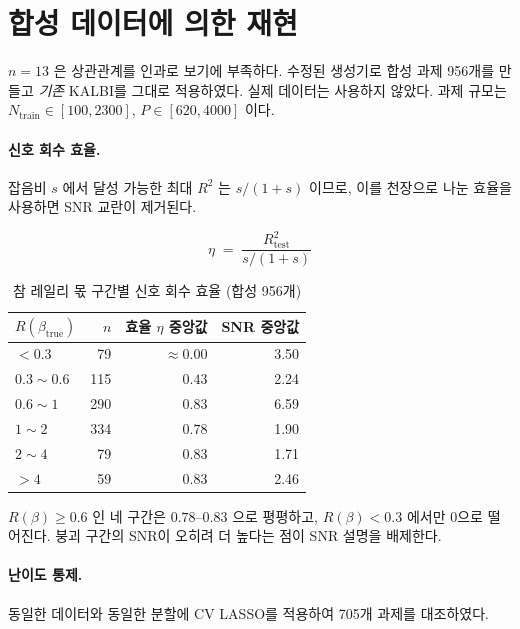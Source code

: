 \documentclass[11pt]{article}
\newcommand{\Rq}{R(\beta)}
\begin{document}
\section{합성 데이터에 의한 재현}

$n=13$ 은 상관관계를 인과로 보기에 부족하다.
수정된 생성기로 합성 과제 956개를 만들고 \emph{기존} KALBI를 그대로 적용하였다.
실제 데이터는 사용하지 않았다.
과제 규모는 $N_{\mathrm{train}} \in [100, 2300]$, $P \in [620, 4000]$ 이다.

\paragraph{신호 회수 효율.}
잡음비 $s$ 에서 달성 가능한 최대 $R^2$ 는 $s/(1+s)$ 이므로,
이를 천장으로 나눈 효율을 사용하면 SNR 교란이 제거된다.

\begin{equation}
\eta \;=\; \frac{R^2_{\text{test}}}{s/(1+s)}
\end{equation}

\begin{table}[h]
\centering
\caption{참 레일리 몫 구간별 신호 회수 효율 (합성 956개)}
\begin{tabular}{@{}lrrr@{}}
\toprule
$R(\beta_{\mathrm{true}})$ & $n$ & 효율 $\eta$ 중앙값 & SNR 중앙값 \\
\midrule
$< 0.3$      &  79 & $\approx 0.00$ & 3.50 \\
$0.3 \sim 0.6$ & 115 & $0.43$ & 2.24 \\
$0.6 \sim 1$ & 290 & $0.83$ & 6.59 \\
$1 \sim 2$   & 334 & $0.78$ & 1.90 \\
$2 \sim 4$   &  79 & $0.83$ & 1.71 \\
$> 4$        &  59 & $0.83$ & 2.46 \\
\bottomrule
\end{tabular}
\end{table}

$\Rq \ge 0.6$ 인 네 구간은 $0.78$--$0.83$ 으로 평평하고,
$\Rq < 0.3$ 에서만 0으로 떨어진다.
붕괴 구간의 SNR이 오히려 더 높다는 점이 SNR 설명을 배제한다.

\paragraph{난이도 통제.}
동일한 데이터와 동일한 분할에 CV LASSO를 적용하여 705개 과제를 대조하였다.
\end{document}
